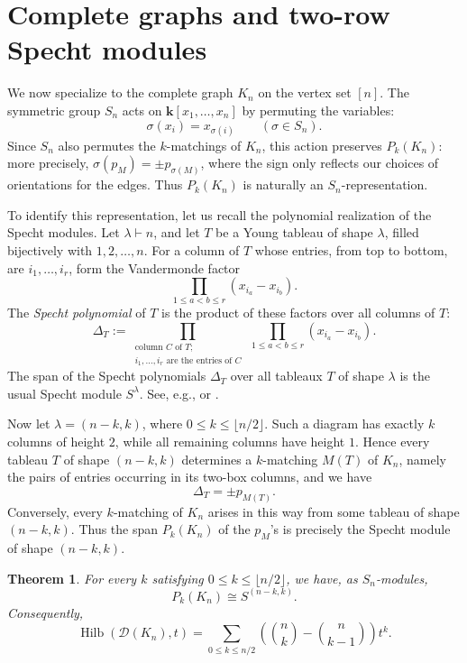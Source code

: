 \documentclass[12pt]{amsart}
\newtheorem{theorem}{Theorem}[section]
\theoremstyle{definition}
\theoremstyle{remark}
\newcommand{\kk}{\mathbf{k}}
\newcommand{\Hilb}{\operatorname{Hilb}}
\begin{document}
\section{Complete graphs and two-row Specht modules}

We now specialize to the complete graph $K_n$ on the vertex set $[n]$.
The symmetric group $S_n$ acts on $\kk[x_1,\ldots,x_n]$ by permuting the
variables:
\[
 \sigma(x_i)=x_{\sigma(i)}
 \qquad(\sigma\in S_n).
\]
Since $S_n$ also permutes the $k$-matchings of $K_n$, this action preserves
$P_k(K_n)$: more precisely, $\sigma(p_M)=\pm p_{\sigma(M)}$, where the sign
only reflects our choices of orientations for the edges.  Thus $P_k(K_n)$ is
naturally an $S_n$-representation.

To identify this representation, let us recall the polynomial realization of
the Specht modules.  Let $\lambda\vdash n$, and let $T$ be a Young tableau of
shape $\lambda$, filled bijectively with $1,2,\ldots,n$.  For a column of $T$
whose entries, from top to bottom, are $i_1,\ldots,i_r$, form the Vandermonde
factor
\[
 \prod_{1\leq a<b\leq r}(x_{i_a}-x_{i_b}).
\]
The \emph{Specht polynomial} of $T$ is the product of these factors over all
columns of $T$:
\[
 \Delta_T
 :=
 \prod_{\substack{\text{column }C\text{ of }T;\\
                   i_1,\ldots,i_r\text{ are the entries of }C}}
 \ \prod_{1\leq a<b\leq r}(x_{i_a}-x_{i_b}).
\]
The span of the Specht polynomials $\Delta_T$ over all tableaux $T$ of shape
$\lambda$ is the usual Specht module $S^\lambda$.
See, e.g., \cite[Satz 1]{Specht} or \cite[Theorem 5.6.1]{sga}.

Now let $\lambda=(n-k,k)$, where
$0\leq k\leq\lfloor n/2\rfloor$.  Such a diagram has exactly $k$ columns of
height $2$, while all remaining columns have height $1$.  Hence every tableau
$T$ of shape $(n-k,k)$ determines a $k$-matching $M(T)$ of $K_n$, namely the
pairs of entries occurring in its two-box columns, and we have
\[
 \Delta_T=\pm p_{M(T)}.
\]
Conversely, every $k$-matching of $K_n$ arises in this way from some tableau of
shape $(n-k,k)$.  Thus the span $P_k(K_n)$ of the $p_M$'s is precisely the
Specht module of shape $(n-k,k)$.


\begin{theorem}\label{thm:complete-specht}
For every $k$ satisfying $0\leq k\leq\lfloor n/2\rfloor$, we have,
as $S_n$-modules,
\[
 P_k(K_n)\cong S^{(n-k,k)}.
\]
Consequently,
\[
 \Hilb(\mathcal D(K_n),t)
 =\sum_{0\leq k\leq n/2}
 \left(\binom nk-\binom n{k-1}\right)t^k.
\]
\end{theorem}
\end{document}
